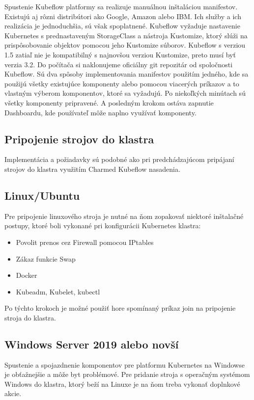 Spustenie Kubeflow platformy sa realizuje manuálnou inštaláciou manifestov. Existujú aj rôzni distribútori ako Google, Amazon alebo IBM. Ich služby a ich realizácia je jednoduchšia, sú však spoplatnené. Kubeflow vyžaduje nastavenie Kubernetes s prednastaveným StorageClass a nástroja Kustomize, ktorý slúži na prispôsobovanie objektov pomocou jeho Kustomize súborov. Kubeflow s verziou 1.5 zatiaľ nie je kompatibilný s najnovšou verziou Kustomize, preto musí byť verzia 3.2. Do počítača si naklonujeme oficiálny git repozitár od spoločnosti Kubeflow. Sú dva spôsoby implementovania manifestov použitím jedného, kde sa použijú všetky existujúce komponenty alebo pomocou viacerých príkazov a to vlastným výberom komponentov, ktoré sa vyžadujú. Po niekoľkých minútach sú všetky komponenty pripravené. A posledným krokom ostáva zapnutie Dashboardu, kde používateľ môže naplno využívať komponenty.

\subsection{Pripojenie strojov do klastra}

Implementácia a požiadavky sú podobné ako pri predchádzajúcom pripájaní strojov do klastra využitím Charmed Kubeflow nasadenia.

\subsection*{Linux/Ubuntu}

Pre pripojenie linuxového stroja je nutné na ňom zopakovať niektoré inštalačné postupy, ktoré boli vykonané pri konfigurácii Kubernetes klastra:

\begin{itemize}
    \item Povolit prenos cez Firewall pomocou IPtables
    \item Zákaz funkcie Swap
    \item Docker
    \item Kubeadm, Kubelet, kubectl
\end{itemize}

Po týchto krokoch je možné použiť hore spomínaný príkaz join na pripojenie stroja do klastra.

\subsection*{Windows Server 2019 alebo novší}

Spustenie a spojazdnenie komponentov pre platformu Kubernetes na Windowse je obťažnejšie a môže byt problémové. Pre pridanie stroja s operačným systémom Windows do klastra, ktorý beží na Linuxe je na ňom treba vykonať doplnkové akcie.

